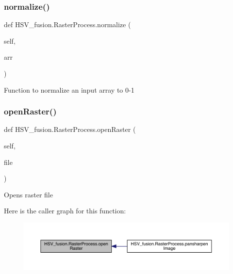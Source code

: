 \subsubsection{\texorpdfstring{normalize()}{normalize()}}
{\footnotesize\ttfamily def H\+S\+V\+\_\+fusion.\+Raster\+Process.\+normalize (\begin{DoxyParamCaption}\item[{}]{self,  }\item[{}]{arr }\end{DoxyParamCaption})}

\begin{DoxyVerb}Function to normalize an input array to 0-1
\end{DoxyVerb}
 \mbox{\label{class_h_s_v__fusion_1_1_raster_process_ab7fc3ba16ff8bedfd26a45811efb93ec}} 
\subsubsection{\texorpdfstring{open\+Raster()}{openRaster()}}
{\footnotesize\ttfamily def H\+S\+V\+\_\+fusion.\+Raster\+Process.\+open\+Raster (\begin{DoxyParamCaption}\item[{}]{self,  }\item[{}]{file }\end{DoxyParamCaption})}

\begin{DoxyVerb}Opens raster file
\end{DoxyVerb}
 Here is the caller graph for this function\+:
\nopagebreak
\begin{figure}[H]
\begin{center}
\leavevmode
\includegraphics[width=350pt]{class_h_s_v__fusion_1_1_raster_process_ab7fc3ba16ff8bedfd26a45811efb93ec_icgraph}
\end{center}
\end{figure}
\mbox{\label{class_h_s_v__fusion_1_1_raster_process_aca76f020e0abc7e7985a82381f989d9a}} 
